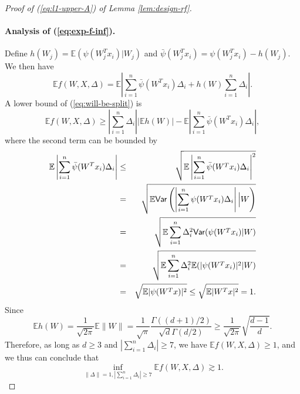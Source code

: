 \begin{proof}[Proof of (\ref{eq:l1-upper-A}) of Lemma \ref{lem:design-rf}]
\paragraph{Analysis of (\ref{eq:exp-f-inf}).} Define $h(W_j)=\mathbb{E}(\psi(W_j^Tx_i)|W_j)$ and $\bar{\psi}(W_j^Tx_i)=\psi(W_j^Tx_i)-h(W_j)$. We then have
\begin{equation}
\mathbb{E}f(W,X,\Delta)=\mathbb{E}\left|\sum_{i=1}^n\bar{\psi}(W^Tx_i)\Delta_i+h(W)\sum_{i=1}^n\Delta_i\right|. \label{eq:will-be-split}
\end{equation}
A lower bound of (\ref{eq:will-be-split}) is
$$\mathbb{E}f(W,X,\Delta)\geq \left|\sum_{i=1}^n\Delta_i\right|\left|\mathbb{E}h(W)\right|-\mathbb{E}\left|\sum_{i=1}^n\bar{\psi}(W^Tx_i)\Delta_i\right|,$$
where the second term can be bounded by
\begin{eqnarray*}
\mathbb{E}\left|\sum_{i=1}^n\bar{\psi}(W^Tx_i)\Delta_i\right| &\leq& \sqrt{\mathbb{E}\left|\sum_{i=1}^n\bar{\psi}(W^Tx_i)\Delta_i\right|^2} \\
&=& \sqrt{\mathbb{E}\Var\left(\left|\sum_{i=1}^n\psi(W^Tx_i)\Delta_i\right|\Big|W\right)} \\
&=& \sqrt{\mathbb{E}\sum_{i=1}^n\Delta_i^2\Var(\psi(W^Tx_i)|W)} \\
&=& \sqrt{\mathbb{E}\sum_{i=1}^n\Delta_i^2\mathbb{E}(|\psi(W^Tx_i)|^2|W)} \\
&=& \sqrt{\mathbb{E}|\psi(W^Tx)|^2} \leq \sqrt{\mathbb{E}|W^Tx|^2} = 1.
\end{eqnarray*}
Since
$$\mathbb{E}h(W)=\frac{1}{\sqrt{2\pi}}\mathbb{E}\|W\|=\frac{1}{\sqrt{\pi}}\frac{\Gamma((d+1)/2)}{\sqrt{d}\Gamma(d/2)}\geq \frac{1}{\sqrt{2\pi}}\sqrt{\frac{d-1}{d}}.$$
Therefore, as long as $d\geq 3$ and $\left|\sum_{i=1}^n\Delta_i\right|\geq 7$, we have $\mathbb{E}f(W,X,\Delta)\geq 1$, and we thus can conclude that
\begin{equation}
\inf_{\|\Delta\|=1,|\sum_{i=1}^n\Delta_i|\geq 7}\mathbb{E}f(W,X,\Delta) \gtrsim 1.\label{eq:l1-1-1}
\end{equation}


\end{proof}
